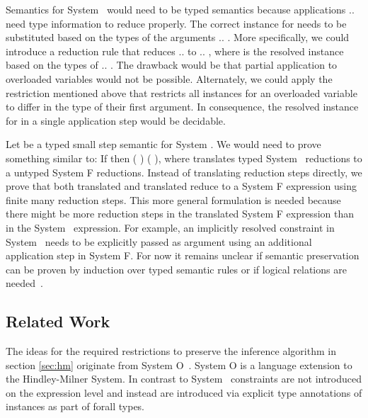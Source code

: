 \noindent Semantics for System \Fo\ would need to be typed semantics because applications      $..$   need type information to reduce properly.
The correct instance for  needs to be substituted based on the types of the arguments  $..$ . 
More specifically, we could introduce a reduction rule  that reduces      $..$   to     $..$  , where  is the resolved instance based on the types of  $..$ . The drawback would be that partial application to overloaded variables would not be possible.
Alternately, we could apply the restriction mentioned above that restricts all instances for an overloaded variable  to differ in the type of their first argument.
In consequence, the resolved instance for  in a single application step     would be decidable.

\noindent Let    be a typed small step semantic for System \Fo. 
We would need to prove something similar to: If    then  \Constr{[}  \Constr{]} (   )  (   ), where  translates typed System \Fo\ reductions to a untyped System F reductions.
Instead of translating reduction steps directly, we prove that both translated  and translated  reduce to a System F expression  using finite many reduction steps.
This more general formulation is needed because there might be more reduction steps in the translated System F expression than in the System \Fo\ expression. 
For example, an implicitly resolved constraint in System \Fo\ needs to be explicitly passed as argument using an additional application step in System F. 
For now it remains unclear if semantic preservation can be proven by induction over typed semantic rules or if logical relations are needed~\cite{logrel}.

\subsection{Related Work}
The ideas for the required restrictions to preserve the inference algorithm in section \ref{sec:hm} originate from System O~\cite{syso}. 
System O is a language extension to the Hindley-Milner System. 
In contrast to System \Fo\, constraints are not introduced on the expression level and instead are introduced via explicit type annotations of instances as part of forall types. 

